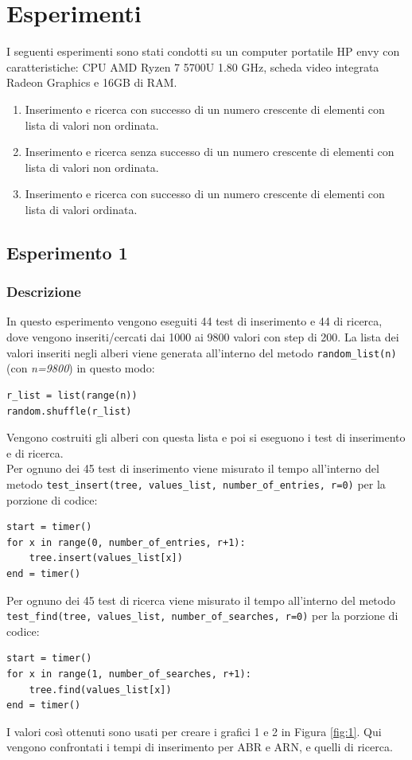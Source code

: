\documentclass{article}
\begin{document}
\section{Esperimenti}
I seguenti esperimenti sono stati condotti su un computer portatile HP envy con caratteristiche: CPU AMD Ryzen 7 5700U 1.80 GHz, scheda video integrata Radeon Graphics e 16GB di RAM.
\begin{enumerate}
    \item Inserimento e ricerca con successo di un numero crescente di elementi con lista di valori non ordinata.
    \item Inserimento e ricerca senza successo di un numero crescente di elementi con lista di valori non ordinata.
    \item Inserimento e ricerca con successo di un numero crescente di elementi con lista di valori ordinata.
\end{enumerate}

\subsection{Esperimento 1}
\subsubsection{Descrizione}
In questo esperimento vengono eseguiti 44 test di inserimento e 44 di ricerca, dove vengono inseriti/cercati dai 1000 ai 9800 valori con step di 200. La lista dei valori inseriti negli alberi viene generata all'interno del metodo \verb|random_list(n)| (con \emph{n=9800}) in questo modo:
\begin{verbatim}
r_list = list(range(n))
random.shuffle(r_list)
\end{verbatim}
Vengono costruiti gli alberi con questa lista e poi si eseguono i test di inserimento e di ricerca.\\
Per ognuno dei 45 test di inserimento viene misurato il tempo all'interno del metodo \verb|test_insert(tree, values_list, number_of_entries, r=0)| per la porzione di codice:
\begin{verbatim}
start = timer()
for x in range(0, number_of_entries, r+1):
    tree.insert(values_list[x])
end = timer()
\end{verbatim}
Per ognuno dei 45 test di ricerca viene misurato il tempo all'interno del metodo \verb|test_find(tree, values_list, number_of_searches, r=0)| per la porzione di codice:
\begin{verbatim}
start = timer()
for x in range(1, number_of_searches, r+1):
    tree.find(values_list[x])
end = timer()
\end{verbatim}
I valori così ottenuti sono usati per creare i grafici 1 e 2 in Figura \ref{fig:1}. Qui vengono confrontati i tempi di inserimento per ABR e ARN, e quelli di ricerca.
\end{document}
